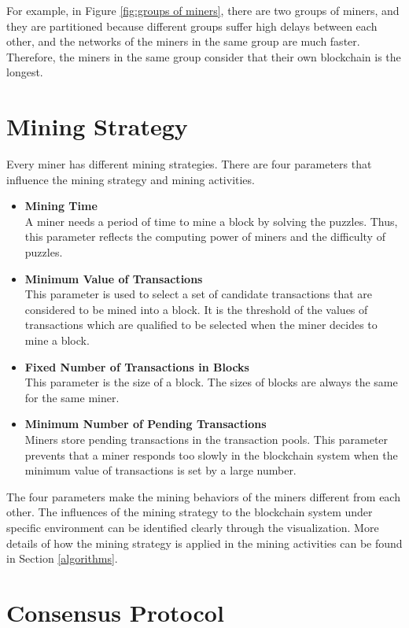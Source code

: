 For example, in Figure \ref{fig:groups of miners}, there are two groups of miners, and they are partitioned because different groups suffer high delays between each other, and the networks of the miners in the same group are much faster. Therefore, the miners in the same group consider that their own blockchain is the longest.

\section{Mining Strategy}

Every miner has different mining strategies. There are four parameters that influence the mining strategy and mining activities. 

\begin{itemize}
    \item \textbf{Mining Time} \\
        A miner needs a period of time to mine a block by solving the puzzles. Thus, this parameter reflects the computing power of miners and the difficulty of puzzles.
    \item \textbf{Minimum Value of Transactions} \\
        This parameter is used to select a set of candidate transactions that are considered to be mined into a block. It is the threshold of the values of transactions which are qualified to be selected when the miner decides to mine a block.
    \item \textbf{Fixed Number of Transactions in Blocks} \\
        This parameter is the size of a block. The sizes of blocks are always the same for the same miner.
    \item \textbf{Minimum Number of Pending Transactions} \\
        Miners store pending transactions in the transaction pools. This parameter prevents that a miner responds too slowly in the blockchain system when the minimum value of transactions is set by a large number.
\end{itemize}

The four parameters make the mining behaviors of the miners different from each other. The influences of the mining strategy to the blockchain system under specific environment can be identified clearly through the visualization. More details of how the mining strategy is applied in the mining activities can be found in Section \ref{algorithms}.

\section{Consensus Protocol}

